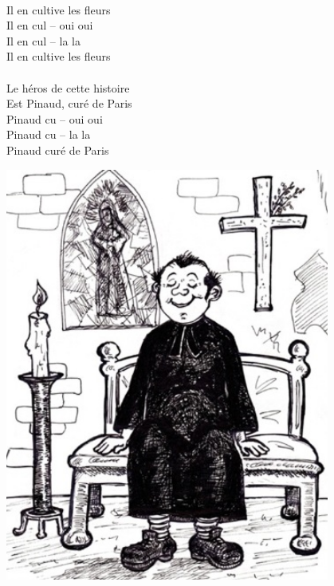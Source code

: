 \\Il en cultive les fleurs
\\Il en cul -- oui oui
\\Il en cul -- la la
\\Il en cultive les fleurs
\\\\Le héros de cette histoire
\\Est Pinaud, curé de Paris
\\Pinaud cu -- oui oui
\\Pinaud cu -- la la
\\Pinaud curé de Paris
\\
\begin{center}
\includegraphics[width=0.8\textwidth]{images/cure_paris.jpg}
\end{center}

\breakpage